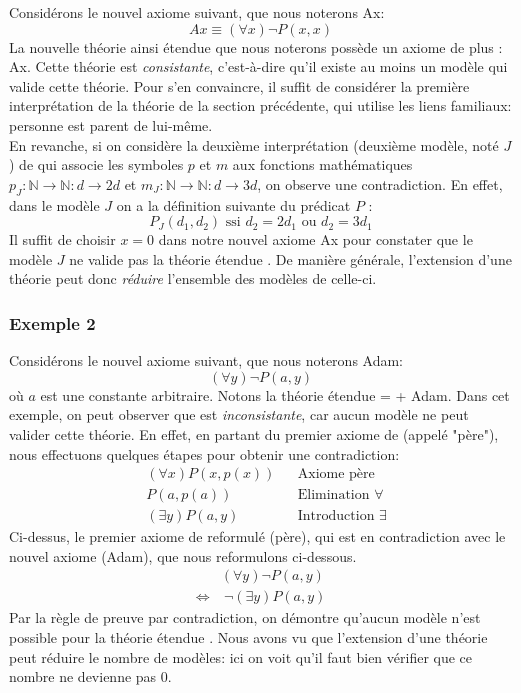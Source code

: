 {Considérons le nouvel axiome suivant, que nous noterons Ax:
$$ Ax \equiv (\forall x) \neg P(x,x) $$
La nouvelle théorie ainsi étendue que nous noterons  possède un axiome de plus : Ax. Cette théorie 
est {\em consistante}, c'est-à-dire qu'il existe au moins un modèle qui valide cette théorie.
Pour s'en convaincre, il suffit de considérer la première interprétation de la théorie  de la section précédente,
qui utilise les liens familiaux: personne est parent de lui-même.\\

En revanche, si on considère la deuxième interprétation (deuxième modèle, noté $J$) de 
qui associe les symboles $p$ et $m$ aux fonctions mathématiques $p_J : \mathbb{N} \rightarrow \mathbb{N} : d \rightarrow 2d$ et $m_J : \mathbb{N} \rightarrow \mathbb{N} : d \rightarrow 3d$, on observe une contradiction.
En effet, dans le modèle $J$ on a la définition suivante du prédicat $P$ :
$$ P_J(d_1, d_2) \textrm{ ssi } d_2 = 2d_1 \textrm{ ou } d_2 = 3d_1$$
Il suffit de choisir $x=0$ dans notre nouvel axiome Ax pour constater que le modèle $J$ ne valide pas la théorie étendue .
De manière générale, l'extension d'une théorie peut donc {\em réduire} l'ensemble des modèles de celle-ci.

\subsubsection{Exemple 2}

Considérons le nouvel axiome suivant, que nous noterons Adam:
$$ (\forall y) \neg P(a,y) $$
où $a$ est une constante arbitraire.
Notons la théorie étendue  =  + Adam. Dans cet exemple, on peut observer que 
est {\em inconsistante}, car aucun modèle ne peut valider cette théorie.
En effet, en partant du premier axiome de  (appelé "père"), nous effectuons quelques étapes pour obtenir une contradiction:
\begin{align*}
& (\forall x) P(x,p(x)) && \textrm{Axiome père} \\
& P(a,p(a)) && \textrm{Elimination } \forall \\
& (\exists y) P(a,y) && \textrm{Introduction } \exists
\end{align*}
Ci-dessus, le premier axiome de  reformulé (père),
qui est en contradiction avec le nouvel axiome (Adam), que nous reformulons ci-dessous.
\begin{align*}
& (\forall y) \neg P(a,y) \\
\Leftrightarrow & \ \neg (\exists y) P(a,y)
\end{align*}
Par la règle de preuve par contradiction, on démontre qu'aucun modèle n'est possible pour la théorie étendue .
Nous avons vu que
l'extension d'une théorie peut réduire le nombre de modèles: ici on voit qu'il faut bien vérifier que ce nombre ne devienne pas 0.

}
